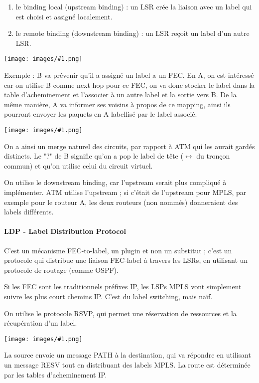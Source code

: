 \documentclass[10pt,a4paper]{report}
\newcommand{\dessin}[1]{\begin{center}\texttt{[image: images/\#1.png]}\end{center}}
\begin{document}
		\begin{enumerate}
			\item le binding local (upstream binding) : un LSR crée la liaison avec un label qui est choisi et assigné localement.
			
			\item le remote binding (downstream binding) : un LSR reçoit un label d'un autre LSR.
		\end{enumerate}
		
		\dessin{24}
		
		Exemple : B va prévenir qu'il a assigné un label a un FEC. En A, on est intéressé car on utilise B comme next hop pour ce FEC, on va donc stocker le label dans la table d'acheminement et l'associer à un autre label et la sortie vers B. De la même manière, A va informer ses voisins à propos de ce mapping, ainsi ils pourront envoyer les paquets en A labellisé par le label associé.
		
		\dessin{25}
		
		On a ainsi un merge naturel des circuits, par rapport à ATM qui les aurait gardés distincts. Le "?"  de B signifie qu'on a pop le label de tête ($\leftrightarrow$ du tronçon commun) et qu'on utilise celui du circuit virtuel.
		
		On utilise le downstream binding, car l'upstream serait plus compliqué à implémenter. ATM utilise l'upstream ; si c'était de l'upstream pour MPLS, par exemple pour le routeur A, les deux routeurs (non nommés) donneraient des labels différents.
		
		\paragraph{LDP - Label Distribution Protocol}
		
		C'est un mécanisme FEC-to-label, un plugin et non un substitut ; c'est un protocole qui distribue une liaison FEC-label à travers les LSRs, en utilisant un protocole de routage (comme OSPF).
		
		Si les FEC sont les traditionnels préfixes IP, les LSPs MPLS vont simplement suivre les plus court chemins IP. C'est du label switching, mais naïf.
	
		On utilise le protocole RSVP, qui permet une réservation de ressources et la récupération d'un label. 
		
		\dessin{26}
		
		La source envoie un message PATH à la destination, qui va répondre en utilisant un message RESV tout en distribuant des labels MPLS. La route est déterminée par les tables d'acheminement IP.
		
\end{document}
